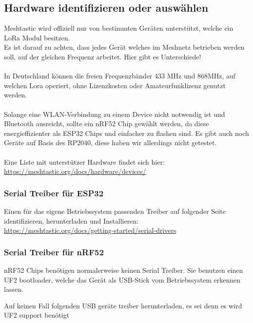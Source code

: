 \documentclass[12pt,a4paper]{article}
\begin{document}
\subsection{Hardware identifizieren oder auswählen}

Meshtastic wird offiziell nur von bestimmten Geräten unterstützt, welche ein LoRa Modul besitzen.
\\
Es ist darauf zu achten, dass jedes Gerät welches im Meshnetz betrieben werden soll, auf der gleichen Frequenz arbeitet. Hier gibt es Unterschiede!\\
\\
In Deutschland können die freien Frequenzbänder 433 MHz und 868MHz, auf welchen Lora operiert, ohne Lizenzkosten oder Amateurfunklizenz genutzt werden.\\
\\
Solange eine WLAN-Verbindung zu einem Device nicht notwendig ist und Bluetooth ausreicht, sollte ein nRF52 Chip gewählt werden,
da diese energieffizienter als ESP32 Chips und einfacher zu flashen sind. Es gibt auch noch Geräte auf Basis des RP2040,
diese haben wir allerdings nicht getestet.\\
\\
Eine Liste mit unterstützer Hardware findet sich hier:\\
\url{https://meshtastic.org/docs/hardware/devices/}

\subsubsection{Serial Treiber für ESP32}
Einen für das eigene Betriebssystem passenden Treiber auf folgender Seite identifizieren, herunterladen und Installieren:
\\
\url{https://meshtastic.org/docs/getting-started/serial-drivers}

\subsubsection{Serial Treiber für nRF52}
nRF52 Chips benötigen normalerweise keinen Serial Treiber. Sie benutzen einen UF2 bootloader, welche das Gerät als USB-Stick vom Betriebssystem erkennen lassen.

Auf keinen Fall folgenden USB geräte treiber herunterladen, es sei denn es wird UF2 support benötigt
\end{document}
